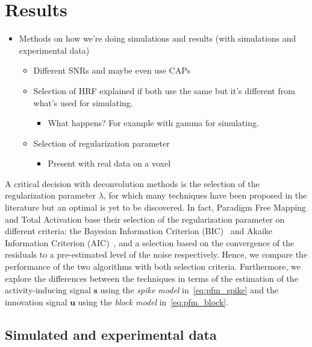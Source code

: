 \section{Results}

\begin{itemize}
    \item Methods on how we're doing simulations and results (with simulations and experimental data)
    \begin{itemize}
        \item Different SNRs and maybe even use CAPs
        \item Selection of HRF explained if both use the same but it's different from what's used for simulating.
        \begin{itemize}
            \item What happens? For example with gamma for simulating.
        \end{itemize}
        \item Selection of regularization parameter
        \begin{itemize}
            \item Present with real data on a voxel
        \end{itemize}
    \end{itemize}
\end{itemize}

A critical decision with deconvolution methods is the selection of the regularization parameter \(\lambda\), for which many techniques have been proposed in the literature but an optimal is yet to be discovered. In fact, Paradigm Free Mapping and Total Activation base their selection of the regularization parameter on different criteria: the Bayesian Information Criterion (BIC)~\cite{schwarz1978estimating} and Akaike Information Criterion (AIC)~\cite{akaike1998information}, and a selection based on the convergence of the residuals to a pre-estimated level of the noise respectively. Hence, we compare the performance of the two algorithms with both selection criteria. Furthermore, we explore the differences between the techniques in terms of the estimation of the activity-inducing signal \(\mathbf{s}\) using the \textit{spike model} in~\eqref{eq:pfm_spike} and the innovation signal \(\mathbf{u}\) using the \textit{block model} in~\eqref{eq:pfm_block}.

\subsection{Simulated and experimental data}

